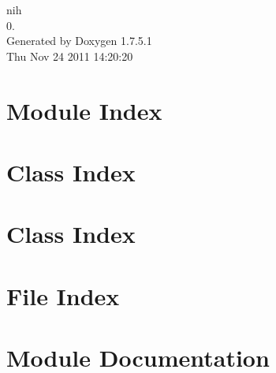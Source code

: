 \documentclass[a4paper]{book}
\begin{document}
\hypersetup{pageanchor=false,citecolor=blue}
\begin{titlepage}
\vspace*{7cm}
\begin{center}
{\Large nih \\[1ex]\large 0. }\\
\vspace*{1cm}
{\large \-Generated by Doxygen 1.7.5.1}\\
\vspace*{0.5cm}
{\small Thu Nov 24 2011 14:20:20}\\
\end{center}
\end{titlepage}
\clearemptydoublepage
{}
\tableofcontents
\clearemptydoublepage
{}
\hypersetup{pageanchor=true,citecolor=blue}
\chapter{\-Module \-Index}

\chapter{\-Class \-Index}

\chapter{\-Class \-Index}

\chapter{\-File \-Index}

\chapter{\-Module \-Documentation}







\end{document}
